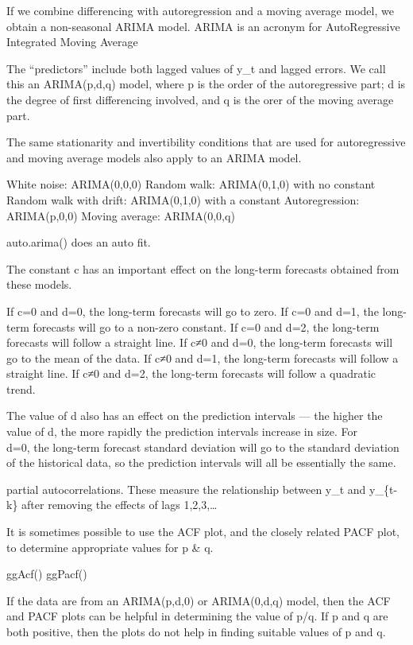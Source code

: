 \documentclass[]{book}
\begin{document}
If we combine differencing with autoregression and a moving average
model, we obtain a non-seasonal ARIMA model. ARIMA is an acronym for
AutoRegressive Integrated Moving Average

The ``predictors'' include both lagged values of y\_t and lagged errors.
We call this an ARIMA(p,d,q) model, where p is the order of the
autoregressive part; d is the degree of first differencing involved, and
q is the orer of the moving average part.

The same stationarity and invertibility conditions that are used for
autoregressive and moving average models also apply to an ARIMA model.

White noise: ARIMA(0,0,0) Random walk: ARIMA(0,1,0) with no constant
Random walk with drift: ARIMA(0,1,0) with a constant Autoregression:
ARIMA(p,0,0) Moving average: ARIMA(0,0,q)

auto.arima() does an auto fit.

The constant c has an important effect on the long-term forecasts
obtained from these models.

If c=0 and d=0, the long-term forecasts will go to zero. If c=0 and d=1,
the long-term forecasts will go to a non-zero constant. If c=0 and d=2,
the long-term forecasts will follow a straight line. If c≠0 and d=0, the
long-term forecasts will go to the mean of the data. If c≠0 and d=1, the
long-term forecasts will follow a straight line. If c≠0 and d=2, the
long-term forecasts will follow a quadratic trend.

The value of d also has an effect on the prediction intervals --- the
higher the value of d, the more rapidly the prediction intervals
increase in size. For\\
d=0, the long-term forecast standard deviation will go to the standard
deviation of the historical data, so the prediction intervals will all
be essentially the same.

partial autocorrelations. These measure the relationship between y\_t
and y\_\{t-k\} after removing the effects of lags 1,2,3,\ldots{}

It is sometimes possible to use the ACF plot, and the closely related
PACF plot, to determine appropriate values for p \& q.

ggAcf() \textbar{} ggPacf()

If the data are from an ARIMA(p,d,0) or ARIMA(0,d,q) model, then the ACF
and PACF plots can be helpful in determining the value of p/q. If p and
q are both positive, then the plots do not help in finding suitable
values of p and q.
\end{document}
